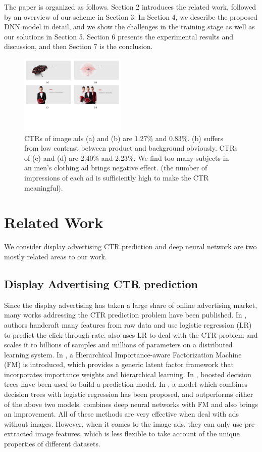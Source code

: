\documentclass{sig-alternate}
\begin{document}
The paper is organized as follows. Section 2 introduces the related work, followed by an overview of our scheme in Section 3. In Section 4, we describe the proposed DNN model in detail, and we show the challenges in the training stage as well as our solutions  in Section 5. Section 6 presents the experimental results and discussion, and then Section 7 is the conclusion.   
\begin{figure}
	\centering
	\includegraphics[width=0.45\textwidth]{compare}
	\caption{CTRs of image ads (a) and (b) are 1.27\% and 0.83\%. (b) suffers from  low contrast between product and background obviously. CTRs of (c) and (d) are 2.40\% and 2.23\%. We find too many subjects in an men's clothing ad brings  negative effect. (the number of impressions of each ad is sufficiently high to make the CTR meaningful).}
	\label{fig:compare}
\end{figure}
\section{Related Work}
We consider display advertising CTR prediction and deep neural network are two mostly related areas to our work.
\subsection{Display Advertising CTR prediction}
Since the display advertising has taken a large share of online advertising market, many works addressing the CTR prediction problem have been published. In \cite{richardson2007predicting,chakrabarti2008contextual}, authors handcraft many features from raw data and use logistic regression (LR) to predict the click-through rate. \cite{chapelle2014simple} also uses LR to deal with the CTR problem and scales it to
billions of samples and millions of parameters on a distributed learning system.  In \cite{oentaryo2014predicting},  a Hierarchical Importance-aware Factorization Machine (FM)  \cite{rendle2012factorization} is introduced, which provides a generic latent factor framework that incorporates importance weights and hierarchical learning. In \cite{dave2010learning}, boosted decision trees have been used to build a prediction model. In \cite{he2014practical},  a model which combines decision
trees with logistic regression has been proposed, and outperforms either of the above two models. \cite{zhang2016deep} combines deep neural networks with FM and also brings  an improvement. All of these methods are very effective when deal with ads without images. However, when it comes to the image ads, they can only use pre-extracted image features, which is less flexible to take account of the unique properties of different datasets.
\end{document}
